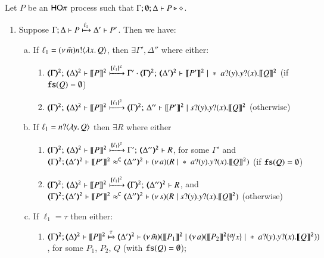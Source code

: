 	Let $P$ be an  $\mathsf{HO}\pi$ process such that  $\Gamma; \emptyset; \Delta \vdash P \triangleright \diamond$.
	
	\begin{enumerate}[1.]
		\item Suppose $\Gamma; \Delta \vdash P \xmapsto{\ell_1} \Delta' \vdash P'$.
		Then we have:
		\begin{enumerate}[a)]
			\item
				If  $\ell_1 = (\nu\, \tilde{m})n ! \langle \lambda x.\,Q \rangle$,
				then $\exists \Gamma', \Delta''$ where either:
				\begin{enumerate}[-]
					\item 
						$\tmap{\Gamma}{2};\, \tmap{\Delta}{2} \proves  \pmap{P}{2} 
						\hby{\mapa{\ell_1}{2}}
						\Gamma' \cdot \tmap{\Gamma}{2};\, \tmap{\Delta'}{2} \proves \pmap{P'}{2} \Par \repl{} \binp{a}{y} \binp{y}{x} \pmap{Q}{2}$ ({if $\mathtt{fs}(Q) = \emptyset$})
					\item 
						$\tmap{\Gamma}{2};\, \tmap{\Delta}{2} \proves \pmap{P}{2} 
						\hby{\mapa{\ell_1}{2}}
						\tmap{\Gamma}{2};\, \Delta'' \proves \pmap{P'}{2} \Par \binp{s}{y} \binp{y}{x} \pmap{Q}{2}$
						(otherwise)
				\end{enumerate}

			\item
				If   
				$\ell_1 = n ? \langle \lambda y.\,Q \rangle$
				then $\exists R$ where
				either
				\begin{enumerate}[-]
					\item 
						$\tmap{\Gamma}{2};\, \tmap{\Delta}{2} \proves \pmap{P}{2} 
						\hby{\mapa{\ell_1}{2}}
						\Gamma';\, \tmap{\Delta''}{2} \proves  R$, for some $ \Gamma'$
						and \\ 
						$\horel{\tmap{\Gamma}{2}}{\tmap{\Delta'}{2}}{\pmap{P'}{2}}{\fwb}{\tmap{\Delta''}{2}}{\newsp{a}{R \Par \repl{} \binp{a}{y} \binp{y}{x} \pmap{Q}{2}}}$ ({if $\mathtt{fs}(Q) = \emptyset$})
					\item 
						$\tmap{\Gamma}{2};\, \tmap{\Delta}{2} \proves \pmap{P}{2}
						\hby{\mapa{\ell_1}{2}}
						\tmap{\Gamma}{2};\, \tmap{\Delta''}{2} \proves R$, 
						and \\ 
						$\horel{\tmap{\Gamma}{2}}{\tmap{\Delta'}{2}}{\pmap{P'}{2}}{\fwb}{\tmap{\Delta''}{2}}{\newsp{s}{R \Par \binp{s}{y} \binp{y}{x} \pmap{Q}{2}}}$  		(otherwise)
				\end{enumerate}

			\item	If
				$\ell_1 = \tau$ then either:

				\begin{enumerate}[-]
					\item	%
						$
						\horel{\tmap{\Gamma}{2}}{\tmap{\Delta}{2}}{\pmap{P}{2}}
						{\hby{\tau}}
						{\tmap{\Delta'}{2}}{}{\newsp{\tilde{m}}{\pmap{P_1}{2} \Par \newsp{a}
						{\pmap{P_2}{2}\subst{a}{x} \Par \repl{} \binp{a}{y} \binp{y}{x} \pmap{Q}{2}}}}
						$, for some $P_1$, $P_2$, $Q$ (with { $\mathtt{fs}(Q) = \emptyset$});


\end{enumerate}
\end{enumerate}
\end{enumerate}
